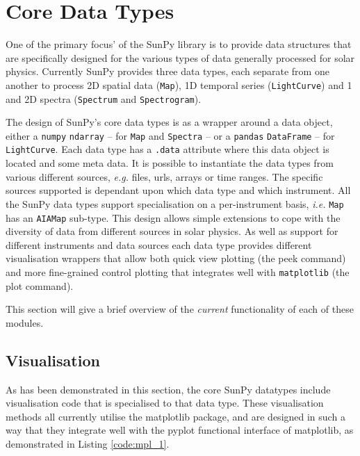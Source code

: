 \section{Core Data Types}
One of the primary focus' of the SunPy library is to provide data structures 
that are specifically designed for the various types of data generally 
processed for solar physics. Currently SunPy provides three data 
types, each separate from one another to process 2D spatial data 
(\texttt{Map}), 1D temporal series (\texttt{LightCurve}) and 1 and 2D spectra 
(\texttt{Spectrum} and \texttt{Spectrogram}).

The design of SunPy's core data types is as a wrapper around a data object, 
either a \texttt{numpy} \texttt{ndarray} -- for \texttt{Map} and \texttt{Spectra} -- or a \texttt{pandas} \texttt{DataFrame} -- for \texttt{LightCurve}.
 Each data type has a \texttt{.data} 
attribute where this data object is located and some meta data. It is 
possible to instantiate the data types from various different 
sources, \textit{e.g.} files, urls, arrays or time ranges. The 
specific sources supported is dependant upon which data type and 
which instrument. All the SunPy data types support specialisation on 
a per-instrument basis, \textit{i.e.} \texttt{Map} has an 
\texttt{AIAMap} sub-type. This design allows simple extensions to 
cope with the diversity of data from different sources in solar 
physics. As well as support for different instruments and data 
sources each data type provides different visualisation wrappers that 
allow both quick view plotting (the peek command) and more 
fine-grained control plotting that integrates well with 
\texttt{matplotlib} (the plot command).

This section will give a brief overview of the \textit{current} functionality 
of each of these modules.





\subsection{Visualisation}
\label{subsec:Viz}
As has been demonstrated in this section, the core SunPy datatypes 
include visualisation code that is specialised to that data type. 
These visualisation methods all currently utilise the matplotlib 
package, and are designed in such a way that they integrate well with 
the pyplot functional interface of matplotlib, as demonstrated in 
Listing \ref{code:mpl_1}.

